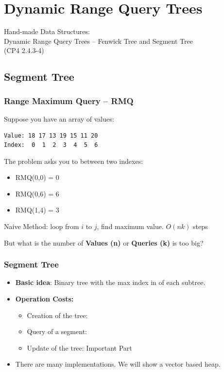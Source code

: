 \section{Dynamic Range Query Trees}
\begin{frame}
  \begin{center}
    Hand-made Data Structures:\\
    Dynamic Range Query Trees -- Fenwick Tree and Segment Tree\\
    (CP4 2.4.3-4)
  \end{center}
\end{frame}

\subsection{Segment Tree}
\begin{frame}[fragile]
  \frametitle{Range Maximum Query -- RMQ}

  Suppose you have an array of values:
\begin{verbatim}
Value: 18 17 13 19 15 11 20
Index:  0  1  2  3  4  5  6
\end{verbatim}

\bigskip

The  problem asks you to  between two indexes:

\begin{itemize}
  \item RMQ(0,0) = 0
  \item RMQ(0,6) = 6
  \item RMQ(1,4) = 3
\end{itemize}

\bigskip

\alert{Naive Method:} loop from $i$ to $j$, find maximum value. $O(nk)$ steps\\
\medskip

But what is the number of {\bf Values (n)} or {\bf Queries (k)} is too big?
\end{frame}

\begin{frame}
  \frametitle{Segment Tree}

  \begin{itemize}
    \item {\bf Basic idea}: Binary tree with the max index in of each subtree.
    \bigskip

    \item {\bf Operation Costs:}
    \begin{itemize}
      \item Creation of the tree: 
      \item Query of a segment: 
      \item Update of the tree:  \hfill \alert{Important Part}
    \end{itemize}
    \bigskip

    \item There are many implementations. We will show a vector based heap.
  \end{itemize}
\end{frame}

